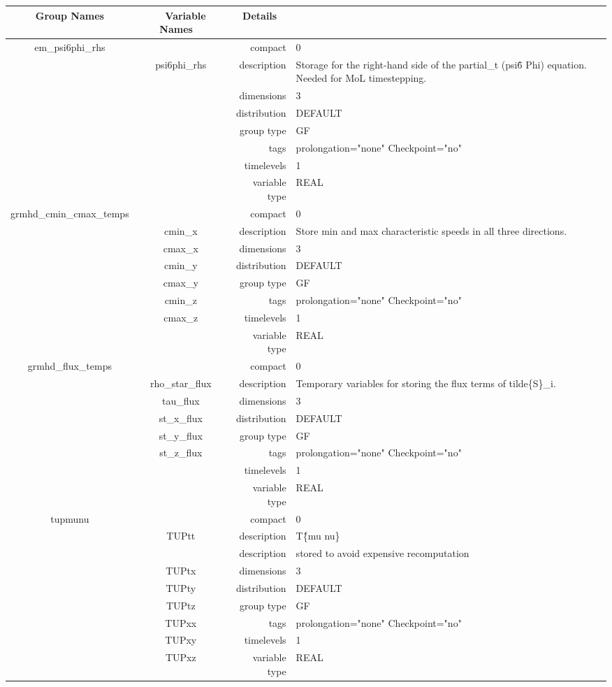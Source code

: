 \begin{tabular*}{150mm}{|c|c@{\extracolsep{\fill}}|rl|} \hline 
~ {\bf Group Names} ~ & ~ {\bf Variable Names} ~  &{\bf Details} ~ & ~ \\ 
\hline 
em\_psi6phi\_rhs &  & compact & 0 \\ 
 & psi6phi\_rhs & description & Storage for the right-hand side of the partial\_t (psi\^6 Phi) equation. Needed for MoL timestepping. \\ 
 &  & dimensions & 3 \\ 
 &  & distribution & DEFAULT \\ 
 &  & group type & GF \\ 
 &  & tags & prolongation="none" Checkpoint="no" \\ 
 &  & timelevels & 1 \\ 
 &  & variable type & REAL \\ 
\hline 
grmhd\_cmin\_cmax\_temps &  & compact & 0 \\ 
 & cmin\_x & description & Store min and max characteristic speeds in all three directions. \\ 
 & cmax\_x & dimensions & 3 \\ 
 & cmin\_y & distribution & DEFAULT \\ 
 & cmax\_y & group type & GF \\ 
 & cmin\_z & tags & prolongation="none" Checkpoint="no" \\ 
 & cmax\_z & timelevels & 1 \\ 
 &  & variable type & REAL \\ 
\hline 
grmhd\_flux\_temps &  & compact & 0 \\ 
 & rho\_star\_flux & description & Temporary variables for storing the flux terms of tilde\{S\}\_i. \\ 
 & tau\_flux & dimensions & 3 \\ 
 & st\_x\_flux & distribution & DEFAULT \\ 
 & st\_y\_flux & group type & GF \\ 
 & st\_z\_flux & tags & prolongation="none" Checkpoint="no" \\ 
 &  & timelevels & 1 \\ 
 &  & variable type & REAL \\ 
\hline 
tupmunu &  & compact & 0 \\ 
 & TUPtt & description & T\^\{mu nu\} \\ 
& ~ & description &  stored to avoid expensive recomputation \\ 
 & TUPtx & dimensions & 3 \\ 
 & TUPty & distribution & DEFAULT \\ 
 & TUPtz & group type & GF \\ 
 & TUPxx & tags & prolongation="none" Checkpoint="no" \\ 
 & TUPxy & timelevels & 1 \\ 
 & TUPxz & variable type & REAL \\ 
\hline 
\end{tabular*} 


